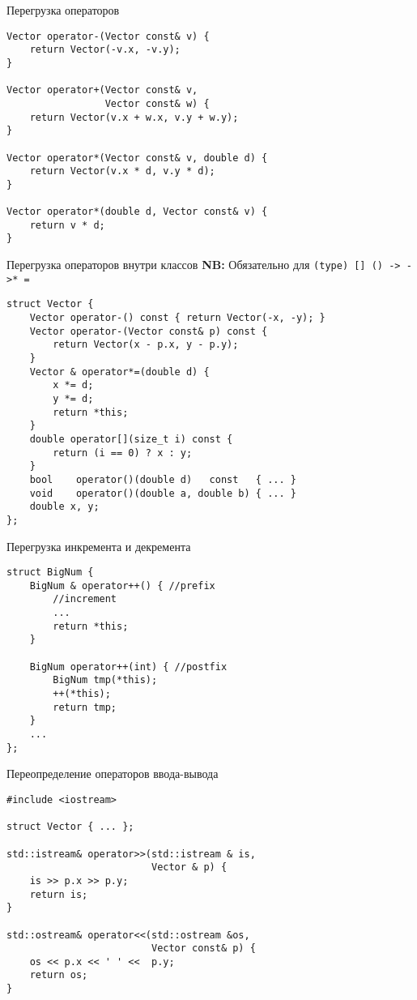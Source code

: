 \documentclass{beamer}
\begin{document}
\begin{frame}[fragile]{Перегрузка операторов}
    \begin{lstlisting}
Vector operator-(Vector const& v) {
    return Vector(-v.x, -v.y);
}

Vector operator+(Vector const& v, 
                 Vector const& w) {
    return Vector(v.x + w.x, v.y + w.y);
}

Vector operator*(Vector const& v, double d) {
    return Vector(v.x * d, v.y * d);
}

Vector operator*(double d, Vector const& v) {
    return v * d;
}
    \end{lstlisting}
\end{frame}

\begin{frame}[fragile]{Перегрузка операторов внутри классов}
    {}\small\textbf{NB:} Обязательно для {\color{blue}\verb!(type) [] () -> ->* =!}

    \begin{lstlisting}[basicstyle=\fontsize{9pt}{1em}\ttfamily]
struct Vector {
    Vector operator-() const { return Vector(-x, -y); }
    Vector operator-(Vector const& p) const {
        return Vector(x - p.x, y - p.y);
    }
    Vector & operator*=(double d) {
        x *= d;
        y *= d;
        return *this;
    }
    double operator[](size_t i) const { 
        return (i == 0) ? x : y;
    }
    bool    operator()(double d)   const   { ... }
    void    operator()(double a, double b) { ... }
    double x, y;
};
    \end{lstlisting}
\end{frame}

\begin{frame}[fragile]{Перегрузка инкремента и декремента}
    \begin{lstlisting}
struct BigNum {
    BigNum & operator++() { //prefix
        //increment
        ...
        return *this;
    }

    BigNum operator++(int) { //postfix
        BigNum tmp(*this);
        ++(*this);
        return tmp;
    }
    ...
};
    \end{lstlisting}
\end{frame}

\begin{frame}[fragile]{Переопределение операторов ввода-вывода}
    \begin{lstlisting}
#include <iostream>
        
struct Vector { ... };

std::istream& operator>>(std::istream & is, 
                         Vector & p) {
    is >> p.x >> p.y;
    return is;
}

std::ostream& operator<<(std::ostream &os, 
                         Vector const& p) {
    os << p.x << ' ' <<  p.y;
    return os;
}
    \end{lstlisting}
\end{frame}
\end{document}
